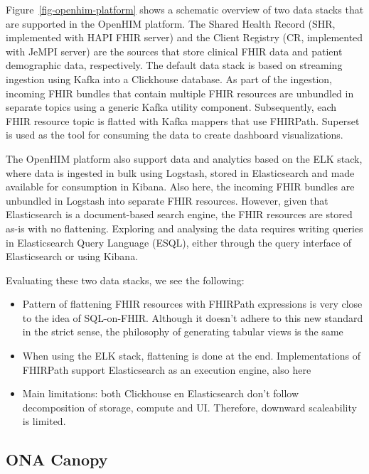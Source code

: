 \documentclass[
  authoryear]{elsarticle}
\providecommand{\tightlist}{%
  \setlength{\itemsep}{0pt}\setlength{\parskip}{0pt}}\usepackage{longtable,booktabs,array}
\begin{document}
Figure~\ref{fig-openhim-platform} shows a schematic overview of two data
stacks that are supported in the OpenHIM platform. The Shared Health
Record (SHR, implemented with HAPI FHIR server) and the Client Registry
(CR, implemented with JeMPI server) are the sources that store clinical
FHIR data and patient demographic data, respectively. The default data
stack is based on streaming ingestion using Kafka into a Clickhouse
database. As part of the ingestion, incoming FHIR bundles that contain
multiple FHIR resources are unbundled in separate topics using a generic
Kafka utility component. Subsequently, each FHIR resource topic is
flatted with Kafka mappers that use FHIRPath. Superset is used as the
tool for consuming the data to create dashboard visualizations.

The OpenHIM platform also support data and analytics based on the ELK
stack, where data is ingested in bulk using Logstash, stored in
Elasticsearch and made available for consumption in Kibana. Also here,
the incoming FHIR bundles are unbundled in Logstash into separate FHIR
resources. However, given that Elasticsearch is a document-based search
engine, the FHIR resources are stored as-is with no flattening.
Exploring and analysing the data requires writing queries in
Elasticsearch Query Language (ES\textbar QL), either through the query
interface of Elasticsearch or using Kibana.

Evaluating these two data stacks, we see the following:

\begin{itemize}
\tightlist
\item
  Pattern of flattening FHIR resources with FHIRPath expressions is very
  close to the idea of SQL-on-FHIR. Although it doesn't adhere to this
  new standard in the strict sense, the philosophy of generating tabular
  views is the same
\item
  When using the ELK stack, flattening is done at the end.
  Implementations of FHIRPath support Elasticsearch as an execution
  engine, also here
\item
  Main limitations: both Clickhouse en Elasticsearch don't follow
  decomposition of storage, compute and UI. Therefore, downward
  scaleability is limited.
\end{itemize}

\subsection{ONA Canopy}\label{ona-canopy}
\end{document}
